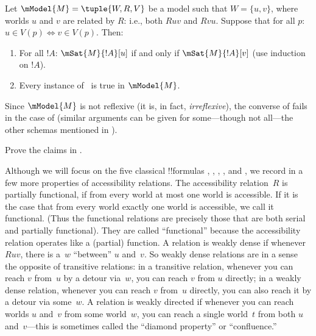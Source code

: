 \documentclass[../../../include/open-logic-section]{subfiles}
\begin{document}
\begin{prop}
  Let $\mModel{M} = \tuple{W, R, V}$ be a model such that $W = \{u, v
  \}$, where worlds $u$ and $v$ are related by $R$: i.e., both $Ruv$
  and $Rvu$.  Suppose that for all $p$: $u \in V(p) \Leftrightarrow v
  \in V(p)$. Then:
  \begin{enumerate}
  \item For all $!A$: $\mSat{M}{!A}[u]$ if and only if
    $\mSat{M}{!A}[v]$ (use induction on $!A$).
  \item Every instance of~ is true in $\mModel{M}$.
  \end{enumerate}
  Since $\mModel{M}$ is not reflexive (it is, in fact,
  \emph{irreflexive}), the converse of 
  fails in the case of  (similar arguments can be given for
  some---though not all---the other schemas mentioned in
  ).
\end{prop}

\begin{prob}
  Prove the claims in .
\end{prob}

Although we will focus on the five classical !!{formula}s ,
, , , and , we record in
 a few more properties of accessibility
relations. The accessibility relation~$R$ is partially functional, if
from every world at most one world is accessible. If it is the case
that from every world exactly one world is accessible, we call it
functional. (Thus the functional relations are precisely those that
are both serial and partially functional). They are called
``functional'' because the accessibility relation operates like a
(partial) function. A relation is weakly dense if whenever $Ruv$,
there is a~$w$ ``between'' $u$ and~$v$. So weakly dense relations are
in a sense the opposite of transitive relations: in a transitive
relation, whenever you can reach $v$ from~$u$ by a detour via~$w$, you
can reach $v$ from $u$ directly; in a weakly dense relation, whenever
you can reach $v$ from~$u$ directly, you can also reach it by a detour
via some~$w$. A relation is weakly directed if whenever you can reach
worlds $u$ and~$v$ from some world~$w$, you can reach a single
world~$t$ from both $u$ and~$v$---this is sometimes called the
``diamond property'' or ``confluence.''
\end{document}
